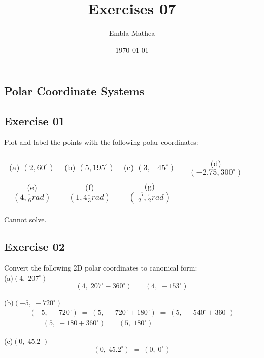 \documentclass[12pt, a4paper]{article}
\title{Exercises 07}
\author{Embla Mathea}
\date{\today}
\begin{document}
\maketitle

\begin{center}
	\section*{Polar Coordinate Systems}	
\end{center}

\subsection*{Exercise 01}

Plot and label the points with the following polar coordinates:

\begin{center}
	\begin{tabular}{ c c c c c }
		 (a) $(2, 60^\circ)$ & (b) $(5, 195^\circ)$ &
		 (c) $(3, -45^\circ)$ & (d) $(-2.75, 300^\circ)$\\
		 (e) $\left(4, \frac{\pi}{6}rad\right)$ &
		 (f) $\left(1, 4\frac{\pi}{3}rad\right)$ &
		 (g) $\left(\frac{-5}{2}, \frac{\pi}{2}rad\right)$
	\end{tabular}
\end{center}

Cannot solve.

\subsection*{Exercise 02}

Convert the following 2D polar coordinates to canonical form:\\

	(a)\quad $(4,\;207^\circ)$
		\begin{equation}
			\tag*{}
			(4,\;207^\circ-360^\circ)\;=\;(4,\;-153^\circ)
		\end{equation}		
	
	(b)\quad $(-5,\;-720^\circ)$
		\begin{gather}
			\tag*{}
			(-5,\;-720^\circ)\;=\;(5,\;-720^\circ+180^\circ)
			\;=\;(5,\;-540^\circ+360^\circ)\\
			\tag*{}
			\;=\;(5,\;-180+360^\circ)\;=\;(5,\;180^\circ)
		\end{gather}
	
	(c)\quad $(0,\;45.2^\circ)$
		\begin{equation}
			\tag*{}
			(0,\;45.2^\circ)\;=\;(0,\;0^\circ)
		\end{equation}
		
\end{document}
